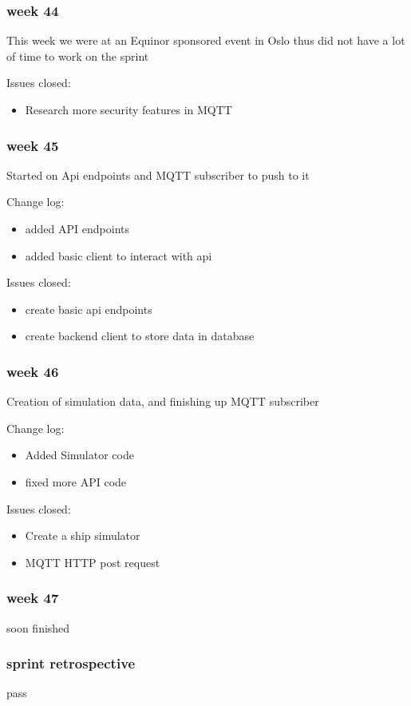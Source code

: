 \documentclass[12pt, a4]{article}
\begin{document}
	\subsubsection{week 44}
	This week we were at an Equinor sponsored event in Oslo thus did not have a lot of time to work on the sprint

	Issues closed:
	\begin{itemize}
		\item Research more security features in MQTT	
	\end{itemize}


	\subsubsection{week 45}
	Started on Api endpoints and MQTT subscriber to push to it

	Change log:
	\begin{itemize}
		\item added API endpoints
		\item added basic client to interact with api
	\end{itemize}

	Issues closed:
	\begin{itemize}
		\item create basic api endpoints
		\item create backend client to store data in database
	\end{itemize}
	\subsubsection{week 46}
	Creation of simulation data, and finishing up MQTT subscriber
	
	Change log:
	\begin{itemize}
		\item Added Simulator code
		\item fixed more API code
	\end{itemize}

	Issues closed:
	\begin{itemize}
		\item Create a ship simulator
		\item MQTT HTTP post request
	\end{itemize}


	\subsubsection{week 47}
	soon finished

	\subsubsection{sprint retrospective}
	pass
\end{document}

